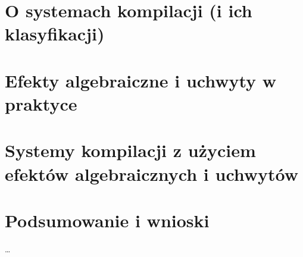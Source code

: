 \documentclass[shortabstract]{iithesis}
\begin{document}
\chapter{O systemach kompilacji (i ich klasyfikacji)}

\chapter{Efekty algebraiczne i uchwyty w praktyce}

\chapter{Systemy kompilacji z użyciem efektów algebraicznych i uchwytów}

\chapter{Podsumowanie i wnioski}

\ldots


\nocite{biernacki2017handle}
\nocite{biernacki2019abstracting}
\nocite{biernacki2019binders}
\nocite{pretnar2015introduction}



\end{document}
